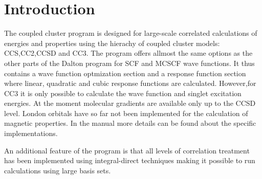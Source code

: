 \chapter{Introduction}\label{ch:cc_intro}

The coupled cluster program is designed for large-scale
correlated calculations of energies and properties using the
hierachy of coupled cluster models: CCS,CC2,CCSD and CC3.
The program offers allmost the same options as the other
parts of the Dalton program for SCF and MCSCF wave functions.
It thus contains a wave function optmization section and a response function section
where linear, quadratic and cubic response functions are calculated.
However,for CC3 it is only possible to calculate the wave function and singlet excitation 
energies. At the moment molecular gradients are available only up to the CCSD level.
London orbitals have so far not been implemented for the calculation of magnetic properties. 
In the manual more details can be found about the specific implementations.

An additional feature of the program is that all levels of correlation
treatment has been implemented using integral-direct techniques making
it possible to run calculations using large basis sets.  


